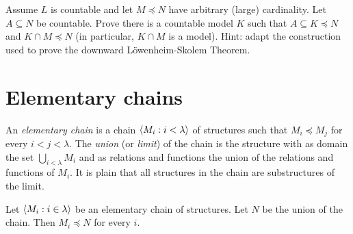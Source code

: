 \documentclass[creche.tex]{subfiles}
\begin{document}
\begin{exercise}\label{ex_LS}
Assume $L$ is countable and let $M\preceq N$ have arbitrary (large) cardinality.
Let $A\subseteq N$ be countable.
Prove there is a countable model $K$ such that $A\subseteq K\preceq N$ and $K\cap M\preceq N$ (in particular, $K\cap M$ is a model).
Hint: adapt the construction used to prove the downward L\"owenheim-Skolem Theorem.\QED
\end{exercise}



\section{Elementary chains}

\def\ceq#1#2#3{%
\parbox{19ex}{\hfill$\displaystyle #1$}%
\parbox{5ex}{\hfil$#2$}%
\parbox[t]{15ex}{$\displaystyle #3$}}



An \emph{elementary chain\/} is a chain $\langle M_i:i<\lambda\rangle$ of structures such that $M_i\preceq M_j$ for every $i<j<\lambda$.
The \emph{union\/} (or \emph{limit\/}) of the chain is the structure with as domain the set $\bigcup_{i<\lambda}M_i$ and as relations and functions the union of the relations and functions of $M_i$.
It is plain that all structures in the chain are substructures of the limit.


\begin{lemma}\label{cateneelementarim}
Let $\langle M_i:i\in\lambda\rangle$ be an elementary chain of structures.
Let $N$ be the union of the chain.
Then $M_i\preceq N$ for every $i$.
\end{lemma}

\def\ceq#1#2#3{%
\parbox{19ex}{\hfill$\displaystyle #1$}%
\parbox{5ex}{\hfil$#2$}%
\parbox{15ex}{$\displaystyle #3$}}
\end{document}
